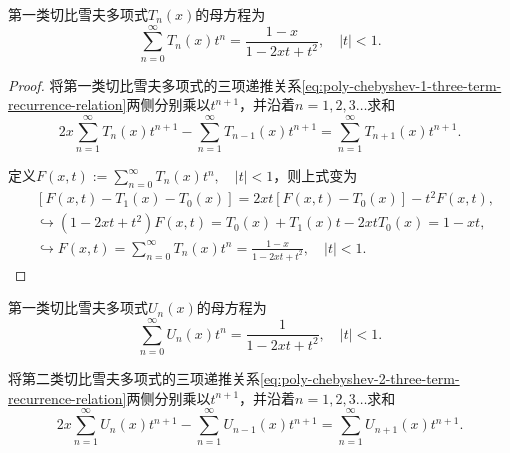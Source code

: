 \begin{subappendices}
\begin{theorem}[第一类切比雪夫多项式的母方程]
  第一类切比雪夫多项式$T_n(x)$的母方程为
  \begin{equation}
    \label{eq:poly-chebyshev-1-generating-function}
    \sum_{n=0}^{\infty} T_n(x) t^n = \frac{1-x}{1 - 2xt + t^2}, \quad \left| t \right| < 1.
  \end{equation}
\end{theorem}
\begin{proof}
  将第一类切比雪夫多项式的三项递推关系\eqref{eq:poly-chebyshev-1-three-term-recurrence-relation}两侧分别乘以$t^{n+1}$，并沿着$n=1,2,3\ldots$求和
  \begin{equation*}
    2x \sum_{n=1}^{\infty} T_{n}(x) t^{n+1} - \sum_{n=1}^{\infty} T_{n-1}(x) t^{n+1} = \sum_{n=1}^{\infty} T_{n+1}(x) t^{n+1}.
  \end{equation*}

  定义$F(x,t):= \sum_{n=0}^{\infty} T_n(x) t^n, \quad \left| t \right| < 1$，则上式变为
  \begin{equation*}
    \begin{split}
      &\left[ F(x,t) - T_1(x) - T_0 (x) \right] = 2 x t \left[ F(x,t) - T_0(x) \right] - t^2 F(x,t),\\
      & \hookrightarrow (1-2xt+t^2) F(x,t) = T_0(x) + T_1(x) t - 2x t T_0(x) = 1 - xt, \\
      & \hookrightarrow F(x,t) = \sum_{n=0}^{\infty} T_n(x) t^n = \frac{1-x}{1 - 2xt + t^2}, \quad \left| t \right| < 1.
  \end{split}
  \end{equation*}
\end{proof}

\begin{theorem}[第二类切比雪夫多项式的母方程]
  第一类切比雪夫多项式$U_n(x)$的母方程为
  \begin{equation}
    \label{eq:poly-chebyshev-2-generating-function}
    \sum_{n=0}^{\infty} U_n(x) t^n = \frac{1}{1 - 2xt + t^2}, \quad \left| t \right| < 1.
  \end{equation}
\end{theorem}

将第二类切比雪夫多项式的三项递推关系\eqref{eq:poly-chebyshev-2-three-term-recurrence-relation}两侧分别乘以$t^{n+1}$，并沿着$n=1,2,3\ldots$求和
\begin{equation*}
  2x \sum_{n=1}^{\infty} U_{n}(x) t^{n+1} - \sum_{n=1}^{\infty} U_{n-1}(x) t^{n+1} = \sum_{n=1}^{\infty} U_{n+1}(x) t^{n+1}.
\end{equation*}


\end{subappendices}
